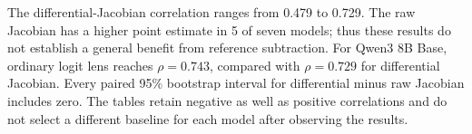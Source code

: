 The differential-Jacobian correlation ranges from 0.479 to 0.729. The raw Jacobian has a higher point estimate in 5 of seven models; thus these results do not establish a general benefit from reference subtraction. For Qwen3 8B Base, ordinary logit lens reaches $\rho=0.743$, compared with $\rho=0.729$ for differential Jacobian. Every paired 95\% bootstrap interval for differential minus raw Jacobian includes zero. The tables retain negative as well as positive correlations and do not select a different baseline for each model after observing the results.
